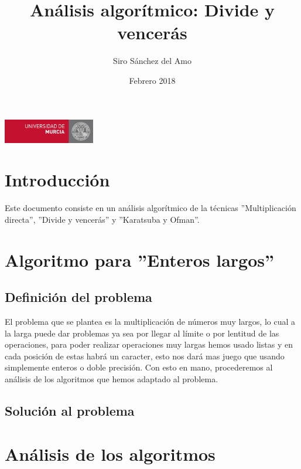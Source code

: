 \documentclass{article}
\title{Análisis algorítmico: Divide y vencerás}
\author{Siro Sánchez del Amo}
\date{Febrero 2018}
\begin{document}
\maketitle
\vfill 
   {\begin{flushright}
   \includegraphics[width=4cm]{umulogo}
   \end{flushright}}

\thispagestyle{empty}
\newpage

\tableofcontents
\thispagestyle{fancy}
\newpage

\section{Introducción}
Este documento consiste en un análisis algorítmico de la técnicas ''Multiplicación directa'', ''Divide y vencerás'' y ''Karatsuba y Ofman''.

\section{Algoritmo para ''Enteros largos''}
\subsection{Definición del problema}
El problema que se plantea es la multiplicación de números muy largos, lo cual a la larga puede dar problemas ya sea por llegar al límite o por lentitud de las operaciones, para poder realizar operaciones muy largas hemos usado listas y en cada posición de estas habrá un caracter, esto nos dará mas juego que usando simplemente enteros o doble precisión. Con esto en mano, procederemos al análisis de los algoritmos que hemos adaptado al problema.

\subsection{Solución al problema}

\section{Análisis de los algoritmos}
\end{document}
